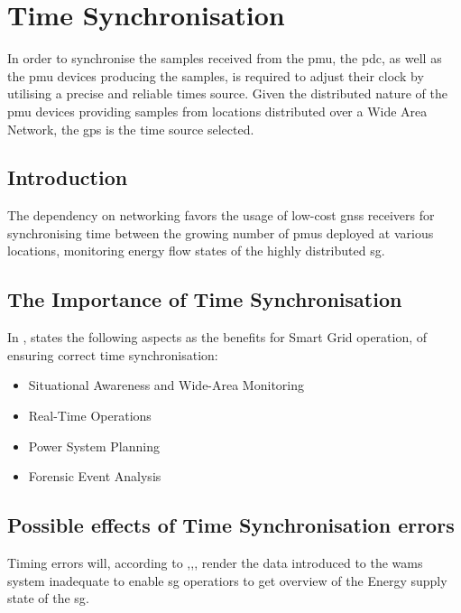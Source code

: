 \section{Time Synchronisation}
In order to synchronise the samples received from the \acrshort{pmu}, the \acrshort{pdc}, as well as the \acrshort{pmu} devices producing the samples, is required to adjust their clock by utilising a precise and reliable times source.  Given the distributed nature of the \acrshort{pmu} devices providing samples from locations distributed over a Wide Area Network, the \acrfull{gps} is the  time source selected. 

\subsection{Introduction}


The dependency on networking favors the usage of low-cost \acrshort{gnss} receivers for synchronising time between the growing number of \acrshort{pmu}s deployed at various locations, monitoring energy flow states of the highly distributed \acrshort{sg}. 



\subsection{The Importance of Time Synchronisation}

In \cite{dagle2019importance}, \citeauthor{dagle2019importance} states the following aspects as the benefits for Smart Grid operation, of ensuring correct time synchronisation:


\begin{itemize}
    \item  Situational Awareness and Wide-Area Monitoring
    \item  Real-Time Operations
    \item  Power System Planning 
    \item  Forensic Event Analysis
    
\end{itemize}

\subsection{Possible effects of Time Synchronisation errors}
Timing errors will, according to ,,, render the data introduced to the \acrshort{wams} system inadequate to enable \acrshort{sg} operatiors to get overview of the Energy supply state of the \acrshort{sg}.

